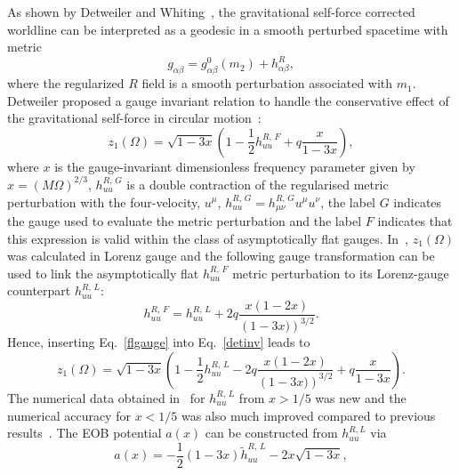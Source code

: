 As shown by Detweiler and Whiting~\cite{Detweiler:2003}, the gravitational self-force corrected worldline can be interpreted as a  geodesic in a smooth perturbed spacetime with metric
 \begin{equation}
 g_{\alpha \beta} =  g^{0}_{\alpha \beta}(m_2) + h^{R}_{\alpha \beta},
 \label{detint}
 \end{equation}
 \noindent where the regularized \(R\) field is a smooth perturbation associated with \(m_1\). Detweiler proposed a gauge invariant relation to handle the conservative effect of the gravitational self-force in circular motion~\cite{Detweiler:2008,Detweiler:2009}:
 \begin{equation}
z_1(\Omega)= \sqrt{1-3x}\left(1- \frac{1}{2} h^{R,\,F}_{uu} + q \frac{x}{1-3x}\right),
\label{detinv}
\end{equation}
\noindent where  \(x\) is the gauge-invariant dimensionless frequency parameter given by \(x=\left(M \Omega\right)^{2/3}\), \(h^{R,\,G}_{uu}\) is a double contraction of the regularised metric perturbation with the four-velocity, \(u^{\mu}\), \( h^{R,\, G}_{uu} = h^{R,\,G}_{\mu\nu}u^{\mu} u^{\nu} \), the label \(G\) indicates the gauge used to evaluate the metric perturbation and the label \(F\) indicates that this expression is valid within the class of asymptotically flat gauges. In~\cite{Akcay:2012}, \(z_1(\Omega)\) was calculated in Lorenz gauge and the following gauge transformation can be used to link the asymptotically flat \(h^{R,\,F}_{uu} \) metric perturbation to its Lorenz-gauge counterpart \(h^{R,\,L}_{uu} \):
\begin{equation}
h^{R,\,F}_{uu} = h^{R,\,L}_{uu} + 2q\frac{x(1-2x)}{\left(1-3x)\right)^{3/2}}.
\label{flgauge}
\end{equation}
\noindent  Hence, inserting Eq.~\eqref{flgauge} into Eq.~\eqref{detinv} leads to
 \begin{equation}
z_1(\Omega)= \sqrt{1-3x}\left(1- \frac{1}{2} h^{R,\,L}_{uu}  - 2q\frac{x(1-2x)}{\left(1-3x)\right)^{3/2}} + q \frac{x}{1-3x}\right).
\label{detinvLOR}
\end{equation}
\noindent The numerical data obtained in~\cite{Akcay:2012} for \(h^{R,\,L}_{uu} \) from \(x>1/5\) was new and the numerical accuracy for \(x<1/5\) was also much improved compared to previous results~\cite{Detweiler:2008,baracknewphi}. The EOB potential \(a(x)\) can be constructed from $h_{uu}^{R,L}$ via
\begin{equation}
 a(x) = -\frac{1}{2}\left(1-3x\right)\tilde{h}^{R,\,L}_{uu} - 2x \sqrt{1-3x},
 \label{formal_a}
 \end{equation}

